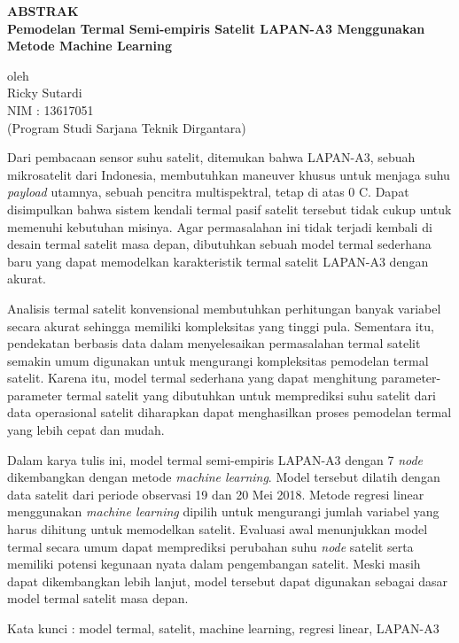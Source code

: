 \begin{center}
       \Large
       \textbf{ABSTRAK} \\
        \vspace{1.5cm}
        \large
        \textbf{Pemodelan Termal Semi-empiris Satelit LAPAN-A3 Menggunakan Metode Machine Learning}\\
        
        \vspace{1.5cm}
        
        oleh\\
        Ricky Sutardi\\
        NIM : 13617051\\
        (Program Studi Sarjana Teknik Dirgantara)\\
        \vspace{1.5cm}
\end{center}

Dari pembacaan sensor suhu satelit, ditemukan bahwa LAPAN-A3, sebuah
mikrosatelit dari Indonesia, membutuhkan maneuver khusus untuk menjaga suhu
\textit{payload} utamnya, sebuah pencitra multispektral, tetap di atas 0
\degree C. Dapat disimpulkan bahwa sistem kendali termal pasif satelit tersebut
tidak cukup untuk memenuhi kebutuhan misinya. Agar permasalahan ini tidak
terjadi kembali di desain termal satelit masa depan, dibutuhkan sebuah model
termal sederhana baru yang dapat memodelkan karakteristik termal satelit
LAPAN-A3 dengan akurat.

Analisis termal satelit konvensional membutuhkan perhitungan banyak variabel
secara akurat sehingga memiliki kompleksitas yang tinggi pula. Sementara itu,
pendekatan berbasis data dalam menyelesaikan permasalahan termal
satelit semakin umum digunakan untuk mengurangi kompleksitas pemodelan termal
satelit. Karena itu, model termal sederhana yang dapat menghitung
parameter-parameter termal satelit yang dibutuhkan untuk memprediksi suhu
satelit dari data operasional satelit diharapkan dapat menghasilkan proses
pemodelan termal yang lebih cepat dan mudah.

Dalam karya tulis ini, model termal semi-empiris LAPAN-A3 dengan 7
\textit{node} dikembangkan dengan metode \textit{machine learning}. Model
tersebut dilatih dengan data satelit dari periode observasi 19 dan 20 Mei 2018.
Metode regresi linear menggunakan \textit{machine learning} dipilih untuk
mengurangi jumlah variabel yang harus dihitung untuk memodelkan satelit.
Evaluasi awal menunjukkan model termal secara umum dapat memprediksi perubahan
suhu \textit{node} satelit serta memiliki potensi kegunaan nyata dalam
pengembangan satelit. Meski masih dapat dikembangkan lebih lanjut, model
tersebut dapat digunakan sebagai dasar model termal satelit masa depan. 

\vspace{1.0cm}
\noindent 
Kata kunci : model termal, satelit, machine learning, regresi linear, LAPAN-A3
